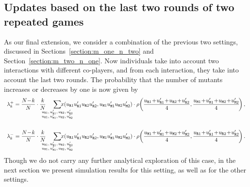 \documentclass[11pt]{article}
\def\resident{\texttt{R}}
\def\mutant{\texttt{M}}
\theoremstyle{plainCl1}
\theoremstyle{plainCl2}
\begin{document}

\subsection{Updates based on the last two rounds of two repeated games}\label{section:m_two_n_two}

As our final extension, we consider a combination of the previous two settings, discussed in Sections~\ref{section:m_one_n_two} and Section~\ref{section:m_two_n_one}. 
Now individuals take into account two interactions with different co-players, and from each interaction, they take into account the last two rounds. 
The probability that the number of mutants increases or decreases by one is now given by
\begin{equation}\label{eq:ratio_TwoRounds}
\begin{array}{l}
\displaystyle \lambda^+_k=\frac{N\!-\!k}{N}\cdot \frac{k}{N} 
\hspace{-0.5cm}
\sum_
{\scriptsize \begin{array}{l}
u_{\resident 1},u_{\resident 1}', u_{\resident 2},u_{\resident 2}'\\
u_{\mutant 1},u_{\mutant 1}', u_{\mutant 2},u_{\mutant 2}'
\end{array}} 
\hspace{-1cm} x(u_{\resident 1} u_{\resident 1}'u_{\resident 2} u_{\resident 2}' ,u_{\mutant 1}u_{\mutant 1}'u_{\mutant 2}u_{\mutant 2}')\cdot 
\rho\!\left(\frac{u_{\resident 1}\!+\! u_{\resident 1}'\!+\!u_{\resident 2}\!+\!u_{\resident 2}' }{4},
\frac{u_{\mutant 1}\!+\!u_{\mutant 1}'\!+\!u_{\mutant 2}\!+\!u_{\mutant 2}'}{4}\!\right), \\[1.4cm]

\displaystyle \lambda^-_k=\frac{N\!-\!k}{N}\cdot \frac{k}{N} 
\hspace{-0.5cm}
\sum_
{\scriptsize \begin{array}{l}
u_{\resident 1},u_{\resident 1}', u_{\resident 2},u_{\resident 2}'\\
u_{\mutant 1},u_{\mutant 1}', u_{\mutant 2},u_{\mutant 2}'
\end{array}} 
\hspace{-1cm} x(u_{\resident 1} u_{\resident 1}'u_{\resident 2} u_{\resident 2}' ,u_{\mutant 1}u_{\mutant 1}'u_{\mutant 2}u_{\mutant 2}')\cdot 
\rho\!\left(\frac{u_{\mutant 1}\!+\!u_{\mutant 1}'\!+\!u_{\mutant 2}\!+\!u_{\mutant 2}'}{4},
\frac{u_{\resident 1}\!+\! u_{\resident 1}'\!+\!u_{\resident 2}\!+\!u_{\resident 2}' }{4}\!\right).
\end{array}
\end{equation}
 Though we do not carry any further analytical exploration of this case, in the
next section we present simulation results for this setting, as well as for the other settings.\\
\end{document}
